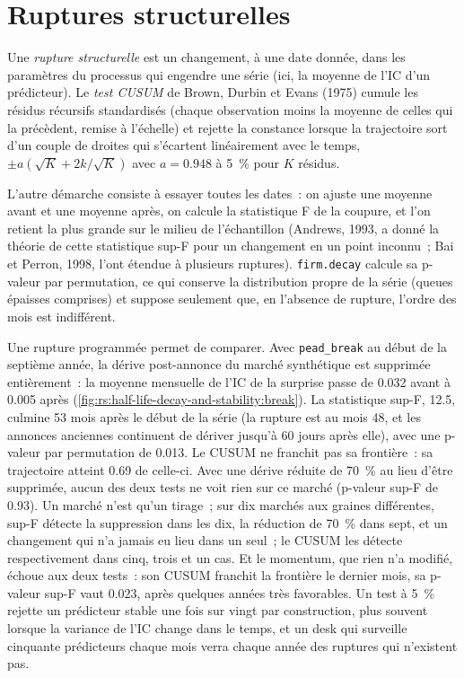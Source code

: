 \section{Ruptures structurelles}

\begin{definition}\label{def:rs:half-life-decay-and-stability:break}
Une \emph{rupture structurelle} est un changement, à une date donnée, dans les paramètres du processus qui engendre une série (ici,
la moyenne de l'IC d'un prédicteur). Le \emph{test CUSUM} de Brown, Durbin et Evans (1975) cumule les résidus récursifs standardisés
(chaque observation moins la moyenne de celles qui la précèdent, remise à l'échelle) et rejette la constance lorsque la trajectoire sort d'un couple de droites
qui s'écartent linéairement avec le temps, $\pm a(\sqrt K + 2k/\sqrt K)$ avec $a = 0.948$ à 5~\% pour $K$ résidus.
\end{definition}

L'autre démarche consiste à essayer toutes les dates~: on ajuste une moyenne avant et une moyenne après, on calcule la statistique F de la coupure, et l'on retient la plus grande sur
le milieu de l'échantillon (Andrews, 1993, a donné la théorie de cette statistique sup-F pour un changement en un point inconnu~; Bai et Perron, 1998,
l'ont étendue à plusieurs ruptures). \texttt{firm.decay} calcule sa p-valeur par permutation, ce qui conserve la distribution propre de la série (queues
épaisses comprises) et suppose seulement que, en l'absence de rupture, l'ordre des mois est indifférent.

Une rupture programmée permet de comparer. Avec \texttt{pead\_break} au début de la septième année, la dérive post-annonce du marché synthétique est
supprimée entièrement~: la moyenne mensuelle de l'IC de la surprise passe de 0.032 avant à 0.005 après (\cref{fig:rs:half-life-decay-and-stability:break}).
La statistique sup-F, 12.5, culmine 53 mois après le début de la série (la rupture est au mois 48, et les annonces anciennes continuent de dériver jusqu'à 60 jours après
elle), avec une p-valeur par permutation de 0.013. Le CUSUM ne franchit pas sa frontière~: sa trajectoire atteint 0.69 de celle-ci. Avec une dérive réduite de 70~\% au lieu d'être supprimée, aucun des deux tests ne voit rien sur ce marché (p-valeur sup-F de 0.93).
Un marché n'est qu'un tirage~; sur dix marchés aux graines différentes, sup-F détecte la suppression dans les dix, la réduction de 70~\% dans sept, et un changement qui
n'a jamais eu lieu dans un seul~; le CUSUM les détecte respectivement dans cinq, trois et un cas. Et le momentum, que rien n'a modifié, échoue aux deux tests~: son CUSUM franchit
la frontière le dernier mois, sa p-valeur sup-F vaut 0.023, après quelques années très favorables. Un test à 5~\% rejette un prédicteur stable une fois sur vingt par construction,
plus souvent lorsque la variance de l'IC change dans le temps, et un desk qui surveille cinquante prédicteurs chaque mois verra chaque année des ruptures
qui n'existent pas.

